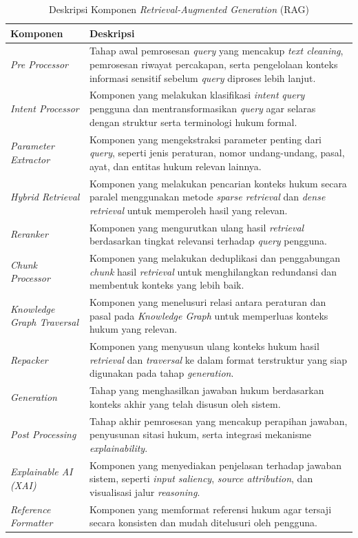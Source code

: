 \begin{table}[H]
\centering
\caption{Deskripsi Komponen \emph{Retrieval-Augmented Generation} (RAG)}
\label{tab:rag-components}
\footnotesize
\begin{tabularx}{\textwidth}{|p{}|X|}
\hline \textbf{Komponen} & \textbf{Deskripsi} \\\hline
\emph{Pre Processor} & Tahap awal pemrosesan \emph{query} yang mencakup \emph{text cleaning}, pemrosesan riwayat percakapan, serta pengelolaan konteks informasi sensitif sebelum \emph{query} diproses lebih lanjut. \\\hline
\emph{Intent Processor} & Komponen yang melakukan klasifikasi \emph{intent} \emph{query} pengguna dan mentransformasikan \emph{query} agar selaras dengan struktur serta terminologi hukum formal. \\\hline
\emph{Parameter Extractor} & Komponen yang mengekstraksi parameter penting dari \emph{query}, seperti jenis peraturan, nomor undang-undang, pasal, ayat, dan entitas hukum relevan lainnya. \\\hline
\emph{Hybrid Retrieval} & Komponen yang melakukan pencarian konteks hukum secara paralel menggunakan metode \emph{sparse retrieval} dan \emph{dense retrieval} untuk memperoleh hasil yang relevan. \\\hline
\emph{Reranker} & Komponen yang mengurutkan ulang hasil \emph{retrieval} berdasarkan tingkat relevansi terhadap \emph{query} pengguna. \\\hline
\emph{Chunk Processor} & Komponen yang melakukan deduplikasi dan penggabungan \emph{chunk} hasil \emph{retrieval} untuk menghilangkan redundansi dan membentuk konteks yang lebih baik. \\\hline
\emph{Knowledge Graph Traversal} & Komponen yang menelusuri relasi antara peraturan dan pasal pada \emph{Knowledge Graph} untuk memperluas konteks hukum yang relevan. \\\hline
\emph{Repacker} & Komponen yang menyusun ulang konteks hukum hasil \emph{retrieval} dan \emph{traversal} ke dalam format terstruktur yang siap digunakan pada tahap \emph{generation}. \\\hline
\emph{Generation} & Tahap yang menghasilkan jawaban hukum berdasarkan konteks akhir yang telah disusun oleh sistem. \\\hline
\emph{Post Processing} & Tahap akhir pemrosesan yang mencakup perapihan jawaban, penyusunan sitasi hukum, serta integrasi mekanisme \emph{explainability}. \\\hline
\emph{Explainable AI (XAI)} & Komponen yang menyediakan penjelasan terhadap jawaban sistem, seperti \emph{input saliency}, \emph{source attribution}, dan visualisasi jalur \emph{reasoning}. \\\hline
\emph{Reference Formatter} & Komponen yang memformat referensi hukum agar tersaji secara konsisten dan mudah ditelusuri oleh pengguna. \\\hline
\end{tabularx}
\end{table}
